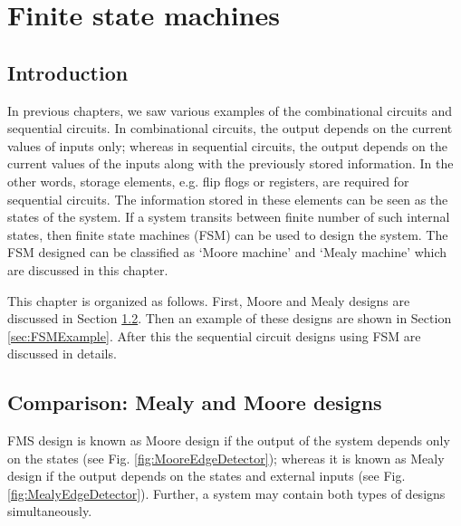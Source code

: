 \chapter{Finite state machines} \label{ch:FSM}

\graphicspath{{Chapters/FSM/Figures/}}


%

\section{Introduction}
In previous chapters, we saw various examples of the combinational circuits and sequential circuits. In combinational circuits, the output depends on the current values of inputs only; whereas in sequential circuits, the output depends on the current values of the inputs along with the previously stored information. In the other words, storage elements, e.g. flip flogs or registers, are required for sequential circuits. The information stored in these elements can be seen as the states of the system. If a system transits between finite number of such internal states, then finite state machines (FSM) can be used to design the system. The FSM designed can be classified as `Moore machine' and `Mealy machine' which are discussed in this chapter.  

This chapter is organized as follows. First, Moore and Mealy designs are discussed in Section \ref{sec:MealyMooreDesign}. Then an example of these designs are shown in Section \ref{sec:FSMExample}. After this the sequential circuit designs using FSM are discussed in details. 

\section{Comparison: Mealy and Moore designs}\label{sec:MealyMooreDesign}
FMS design is known as Moore design if the output of the system depends only on the states (see Fig. \ref{fig:MooreEdgeDetector}); whereas it is known as Mealy design if the output depends on the states and external inputs (see Fig. \ref{fig:MealyEdgeDetector}). Further, a system may contain both types of designs simultaneously. 

